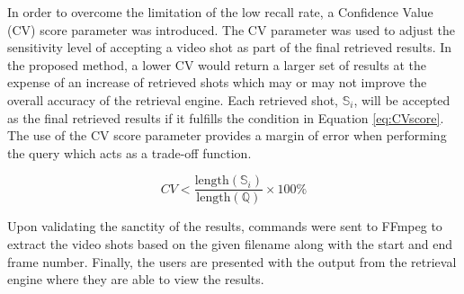 In order to overcome the limitation of the low recall rate, a Confidence Value (CV) score parameter was introduced. The CV parameter was used to adjust the sensitivity level of accepting a video shot as part of the final retrieved results. In the proposed method, a lower CV would return a larger set of results at the expense of an increase of retrieved shots which may or may not improve the overall accuracy of the retrieval engine. Each retrieved shot, $\mathbb{S}_i$, will be accepted as the final retrieved results if it fulfills the condition in Equation \ref{eq:CVscore}. The use of the CV score parameter provides a margin of error when performing the query which acts as a trade-off function.

\begin{equation}
\label{eq:CVscore}
CV < \frac{\text{length}(\mathbb{S}_i)}{\text{length}(\mathbb{Q})} \times 100\%
\end{equation}



Upon validating the sanctity of the results, commands were sent to FFmpeg to extract the video shots based on the given filename along with the start and end frame number. Finally, the users are presented with the output from the retrieval engine where they are able to view the results.


